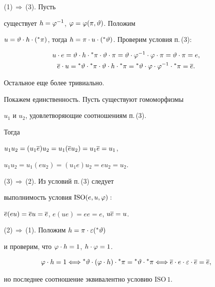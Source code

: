\begin{pf} (1)\,$\Longrightarrow$\,(3). Пусть


существует $h=\varphi^{-1}$, $\varphi=\varphi(\pi,\vartheta)$. Положим


$u=\te\cdot h\cdot(\a{\pi})$, тогда $h=\pi\cdot u\cdot


(\a{\te})$. Проверим условия п.\,(3):


\begin{gather*}


u\cdot e=\te\cdot h\cdot\a{\pi}\cdot\te\cdot\pi=


\te\cdot\f^{-1}\cdot \f\cdot\pi=\te\cdot\pi=e,\\


\o{e}\cdot u=\a{\te}\cdot\a{\pi}\cdot\te\cdot h \cdot\a{\pi}=


\a{\te}\cdot\f\cdot\f^{-1}\cdot\a{\pi}=\o{e}.


\end{gather*}


Остальное еще более тривиально.


Покажем единственность. Пусть существуют гомоморфизмы


$u_1$ и $u_2$, удовлетворяющие соотношениям п.\,(3).


Тогда


$u_1 u_2=(u_1 \overline{e})u_2=u_1(\overline{e}u_2)=u_1 \overline{e}=u_1$,


$u_1 u_2=u_1(e u_2)=(u_1 e)u_2=eu_2=u_2$.





(3)\,$\Longrightarrow$\,(2). Из условий п.\,(3) следует


выполнимость условия ${\mathrm{ISO}}(e,u,\varphi):$


$\overline{e}(eu)=\overline{e}u=\overline{e}$, $ e(ue)=ee=e$, $u\overline{e}=u$.





(2)\,$\Longrightarrow$\,(1). Положим $h=\pi\cdot\varepsilon({}^{\ast}{\vartheta})$


и проверим, что $\varphi\cdot h=1$, $h\cdot \varphi=1$.


$$


\f\cdot h=1 \Longleftrightarrow


\a{\te}\cdot(\f\cdot h)\cdot \a{\pi}=\a{\te}\cdot\a{\pi}


\Longleftrightarrow \o{e}\cdot e\cdot \ep\cdot \o{e}=\o{e},


$$


но последнее соотношение эквивалентно условию ${\mathrm{ISO\,1}}$.



\end{pf}

